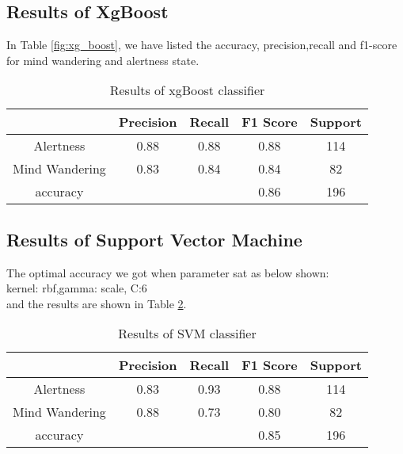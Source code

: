 \subsection{Results of XgBoost }
In Table \ref{fig:xg_boost}, we have listed the accuracy, precision,recall and f1-score for mind wandering and alertness state.  
\begin{table}[ht]
    \centering
     \caption{Results of xgBoost classifier }
     {\renewcommand{\arraystretch}{1.2}
    \begin{tabular}{ccccc}
       \hline
       \hline
         & Precision & Recall & F1 Score & Support \\
        \hline
          Alertness   &    0.88    &  0.88      & 0.88      & 114 \\
         Mind Wandering      & 0.83 &     0.84      & 0.84       & 82 \\
    accuracy   &            &            & 0.86      & 196 \\
          \hline
          \hline
    \end{tabular}
    }
    \label{tab:xqboost_res}
\end{table}

\subsection{Results of Support Vector Machine }
The optimal accuracy we got when parameter sat as below shown:\\
kernel: rbf,gamma: scale, C:6 \\ 
and the results are shown in Table \ref{tab:SVM_res}.
\begin{table}[ht]
    \centering
    \caption{Results of SVM classifier}
    {\renewcommand{\arraystretch}{1.2}
    \begin{tabular}{ccccc}
       \hline
       \hline
         & Precision & Recall & F1 Score & Support \\
        \hline
         Alertness    &   0.83 &    0.93 &     0.88 &       114\\
         Mind Wandering    &   0.88  &    0.73 &      0.80      &  82 \\
        accuracy    &          &            &     0.85      & 196 \\
          \hline
          \hline
    \end{tabular}
    }
    \label{tab:SVM_res}
\end{table}
